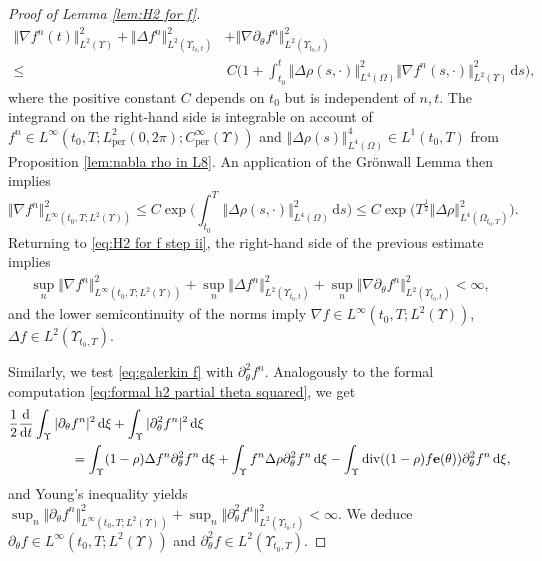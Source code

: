 \documentclass[11pt,a4paper,reqno]{amsart}
\theoremstyle{remark}
\theoremstyle{definition}
\numberwithin{equation}{section}
\newcommand{\per}{\mathrm{per}}
\DeclareMathOperator{\dv}{div}
\newcommand{\e}{{\bf e}}
\newcommand{\bxi}{\xi}
\renewcommand{\d}{\, \mathrm{d} }
\newcommand{\der}{\mathrm{d}}
\begin{document}
\begin{proof}[Proof of Lemma \ref{lem:H2 for f}]
\begin{equation}
\begin{aligned}
        \Vert\nabla f^n(t) \Vert_{L^2(\Upsilon)}^2 +\! \Vert\Delta  f^n\Vert_{L^2(\Upsilon_{t_0,t})}^2 &+ \Vert\nabla \partial_\theta f^n \Vert_{L^2(\Upsilon_{t_0,t})}^2 \\ 
        \leq & \, C \bigg( 1 +  \int_{t_0}^t  \Vert \Delta \rho(s,\cdot) \Vert_{L^4(\Omega)}^2 \Vert \nabla f^n(s,\cdot) \Vert_{L^2(\Upsilon)}^2 \d s \bigg), 
     \end{aligned}
 \end{equation} 
 where the positive constant $C$ depends on $t_0$ but is independent of $n,t$. The integrand on the right-hand side is integrable on account of $f^n \in L^\infty(t_0,T;L^2_\per(0,2\pi);C^\infty_\per(\Upsilon))$ and $\Vert \Delta \rho(s) \Vert_{L^4(\Omega)}^4 \in L^1(t_0,T)$ from Proposition \ref{lem:nabla rho in L8}. An application of the Gr\"onwall Lemma then implies 
 \begin{equation*}
     \Vert\nabla f^n \Vert_{L^\infty(t_0,T;L^2(\Upsilon))}^2 \leq C \exp \bigg( \int_{t_0}^T  \Vert \Delta \rho(s,\cdot) \Vert_{L^4(\Omega)}^2 \d s \bigg) \leq C \exp \Big ( T^{\frac{1}{2}} \Vert \Delta \rho \Vert_{L^4(\Omega_{t_0,T})}^2 \Big). 
 \end{equation*} 
 Returning to \eqref{eq:H2 for f step ii}, the right-hand side of the previous estimate implies
  \begin{equation*}
     \begin{aligned}
        \sup_n \Vert\nabla f^n \Vert_{L^\infty(t_0,T;L^2(\Upsilon))}^2 +\! \sup_n \Vert\Delta f^n\Vert_{L^2(\Upsilon_{t_0,t})}^2 + \sup_n \Vert\nabla \partial_\theta f^n \Vert_{L^2(\Upsilon_{t_0,t})}^2 < \infty, 
     \end{aligned}
 \end{equation*}
 and the lower semicontinuity of the norms imply $\nabla f \in L^\infty(t_0,T;L^2(\Upsilon))$, $\Delta f \in L^2(\Upsilon_{t_0,T}).$ 


 Similarly, we test \eqref{eq:galerkin f} with $\partial^2_\theta f^n$. Analogously to the formal computation \eqref{eq:formal h2 partial theta squared}, we get 
     \begin{equation*}
        \begin{aligned}
            \frac{1}{2}\frac{\der}{\der t}\int_\Upsilon |\partial_\theta & f^n|^2 \d \bxi + \int_\Upsilon |\partial^2_\theta f^n|^2 \d \bxi \\ 
            &= \int_\Upsilon (1-\rho)\Delta f^n \partial^2_\theta f^n \d \bxi + \int_\Upsilon f^n \Delta \rho \partial^2_\theta f^n \d \bxi - \int_\Upsilon \dv((1-\rho) f \e(\theta)) \partial^2_\theta f^n \d \bxi, 
        \end{aligned}
    \end{equation*}
    and Young's inequality yields $\sup_n \Vert\partial_\theta f^n \Vert_{L^\infty(t_0,T;L^2(\Upsilon))}^2 \!+\! \sup_n \Vert \partial^2_\theta f^n\Vert_{L^2(\Upsilon_{t_0,t})}^2  < \infty$. We deduce $\partial_\theta f \in L^\infty(t_0,T;L^2(\Upsilon))$ and $\partial^2_\theta f \in L^2(\Upsilon_{t_0,T})$. 



\end{proof}
\end{document}
